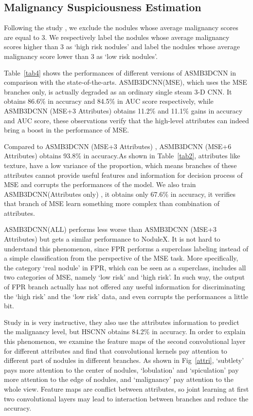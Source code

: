 \documentclass[runningheads]{llncs}
\begin{document}
\subsection{Malignancy Suspiciousness Estimation}
\label{MSE}
Following the study \cite{Shen2017Multi}\cite{Causey2018Highly}, we exclude the nodules whose average malignancy scores are equal to 3. We respectively label the nodules whose average malignancy scores higher than 3 as `high risk nodules' and  label the nodules whose average malignancy score lower than 3 as `low risk nodules'.

Table~\ref{tab4} shows the performances of different versions of ASMB3DCNN in comparison with the state-of-the-arts. ASMB3DCNN(MSE), which uses the MSE branches only, is actually degraded as an ordinary single steam 3-D CNN. It obtains 86.6\% in accuracy and 84.5\% in AUC score respectively, while ASMB3DCNN (MSE+3  Attributes)  obtains 11.2\% and 11.1\% gains in accuracy and AUC score, these observations verify that the high-level attributes can indeed bring a boost in the performance of MSE.

Compared to  ASMB3DCNN (MSE+3  Attributes) ,  ASMB3DCNN (MSE+6  Attributes) obtains 93.8\% in accuracy.As shown in Table~\ref{tab2}, attributes like texture, have a low  variance of the proportion, which means branches of these attributes cannot provide useful features and information for decision process of MSE and corrupts the performances of the model.
We also train ASMB3DCNN(Attributes only) , it obtains only 67.6\%  in accuracy, it verifies that branch of MSE learn something more complex than combination of attributes.

 ASMB3DCNN(ALL)  performs less worse than ASMB3DCNN (MSE+3 Attributes) but gets a similar performance to NoduleX. It is not hard to understand this phenomenon, since FPR performs a superclass labeling instead of a simple classification from the perspective of the MSE task.  More specifically, the category `real nodule' in FPR, which can be seen as a superclass, includes all two categories of MSE, namely `low risk' and `high risk'. In such way, the output of FPR branch actually has not offered any useful information for discriminating the `high risk' and the `low risk' data, and even corrupts the performances a little bit. 

Study in \cite{shen2019interpretable} is very instructive, they also use the attributes information to predict the malignancy level, but HSCNN obtains 84.2\% in accuracy. In order to explain this phenomenon, we examine  the feature maps of the second convolutional layer for different attributes and find that convolutional kernels pay attention to different part of nodules in different branches. As shown in Fig~\ref{attri}, `subtlety' pays more attention to the center of nodules, `lobulation' and `spiculation' pay more attention to the edge of nodules, and `malignancy' pay attention to the whole view. Feature maps are conflict between attributes, so joint learning at first two convolutional layers may lead to interaction between branches and reduce the accuracy.
\end{document}
